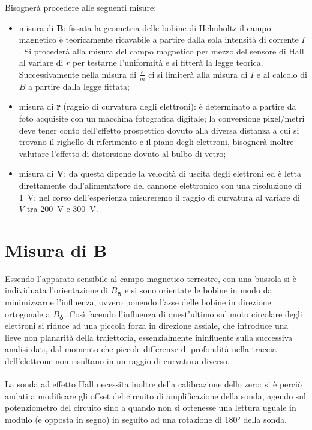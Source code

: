 \noindent Bisognerà procedere alle seguenti misure:
\begin{itemize}
	\item misura di \textbf{B}: fissata la geometria delle bobine di Helmholtz il campo magnetico è teoricamente ricavabile a partire dalla sola intensità di corrente $I$. Si procederà alla misura del campo magnetico per mezzo del sensore di Hall al variare di $r$ per testarne l'uniformità e si fitterà la legge teorica. Successivamente nella misura di $\tfrac{e}{m}$ ci si limiterà alla misura di $I$ e al calcolo di $B$ a partire dalla legge fittata;
	\item misura di \textbf{r} (raggio di curvatura degli elettroni): è determinato a partire da foto acquisite con un macchina fotografica digitale; la conversione pixel/metri deve tener conto dell'effetto prospettico dovuto alla diversa distanza a cui si trovano il righello di riferimento e il piano degli elettroni, bisognerà inoltre valutare l'effetto di distorsione dovuto al bulbo di vetro;
	\item misura di \textbf{V}: da questa dipende la velocità di uscita degli elettroni ed è letta direttamente dall'alimentatore del cannone elettronico con una risoluzione di \SI{1}{\volt}; nel corso dell'esperienza misureremo il raggio di curvatura al variare di $V$ tra \SI{200}{\volt} e \SI{300}{\volt}.
\end{itemize}
\newpage
\section{Misura di \textbf{B}}
Essendo l'apparato sensibile al campo magnetico terrestre, con una bussola si è individuata l'orientazione di $B_{\earth}$ e si sono orientate le bobine in modo da minimizzarne l'influenza, ovvero ponendo l'asse delle bobine in direzione ortogonale a $B_{\earth}$. Così facendo l'influenza di quest'ultimo sul moto circolare degli elettroni si riduce ad una piccola forza in direzione assiale, che introduce una lieve non planarità della traiettoria, essenzialmente ininfluente sulla successiva analisi dati, dal momento che piccole differenze di profondità nella traccia dell'elettrone non risultano in un raggio di curvatura diverso.

\paragraph{} La sonda ad effetto Hall necessita inoltre della calibrazione dello zero: si è perciò andati a modificare gli offset del circuito di amplificazione della sonda, agendo sul potenziometro del circuito sino a quando non si ottenesse una lettura uguale in modulo (e opposta in segno) in seguito ad una rotazione di \ang{180} della sonda.

